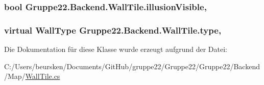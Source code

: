 \hypertarget{class_gruppe22_1_1_backend_1_1_wall_tile_ad8aa8c7bad2a9498707430df283e4492}{
\subsubsection[{illusion\-Visible}]{\setlength{\rightskip}{0pt plus 5cm}bool Gruppe22.\-Backend.\-Wall\-Tile.\-illusion\-Visible\hspace{0.3cm}{\ttfamily [get]}, {\ttfamily [set]}}}\label{class_gruppe22_1_1_backend_1_1_wall_tile_ad8aa8c7bad2a9498707430df283e4492}
\hypertarget{class_gruppe22_1_1_backend_1_1_wall_tile_a3bc2fdbeaac290597127efef9cce32e6}{
\subsubsection[{type}]{\setlength{\rightskip}{0pt plus 5cm}virtual {\bf Wall\-Type} Gruppe22.\-Backend.\-Wall\-Tile.\-type\hspace{0.3cm}{\ttfamily [get]}, {\ttfamily [set]}}}\label{class_gruppe22_1_1_backend_1_1_wall_tile_a3bc2fdbeaac290597127efef9cce32e6}


Die Dokumentation für diese Klasse wurde erzeugt aufgrund der Datei\-:\begin{DoxyCompactItemize}
\item 
C\-:/\-Users/beursken/\-Documents/\-Git\-Hub/gruppe22/\-Gruppe22/\-Gruppe22/\-Backend/\-Map/\hyperlink{_wall_tile_8cs}{Wall\-Tile.\-cs}\end{DoxyCompactItemize}
